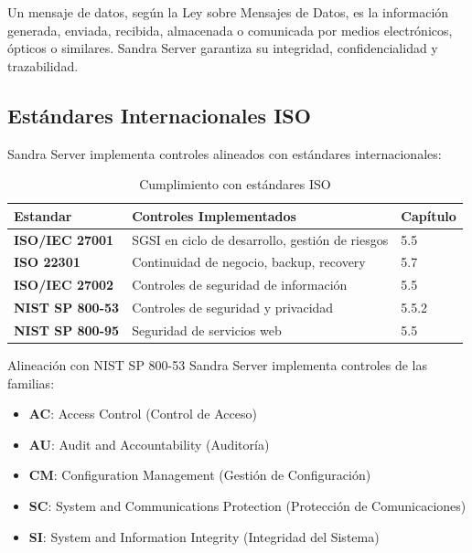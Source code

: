 \begin{definicion}
Un mensaje de datos, según la Ley sobre Mensajes de Datos, es la información generada, enviada, recibida, almacenada o comunicada por medios electrónicos, ópticos o similares. Sandra Server garantiza su integridad, confidencialidad y trazabilidad.
\end{definicion}

\subsection{Estándares Internacionales ISO}

Sandra Server implementa controles alineados con estándares internacionales:

\begin{table}[H]
\centering
\caption{Cumplimiento con estándares ISO}
\begin{tabular}{|l|p{7cm}|p{3cm}|}
\hline
\textbf{Estandar} & \textbf{Controles Implementados} & \textbf{Capítulo} \\ \hline
\textbf{ISO/IEC 27001} & SGSI en ciclo de desarrollo, gestión de riesgos & 5.5 \\ \hline
\textbf{ISO 22301} & Continuidad de negocio, backup, recovery & 5.7 \\ \hline
\textbf{ISO/IEC 27002} & Controles de seguridad de información & 5.5 \\ \hline
\textbf{NIST SP 800-53} & Controles de seguridad y privacidad & 5.5.2 \\ \hline
\textbf{NIST SP 800-95} & Seguridad de servicios web & 5.5 \\ \hline
\end{tabular}
\end{table}

\begin{caja}{Alineación con NIST SP 800-53}
Sandra Server implementa controles de las familias:
\begin{itemize}
\item \textbf{AC}: Access Control (Control de Acceso)
\item \textbf{AU}: Audit and Accountability (Auditoría)
\item \textbf{CM}: Configuration Management (Gestión de Configuración)
\item \textbf{SC}: System and Communications Protection (Protección de Comunicaciones)
\item \textbf{SI}: System and Information Integrity (Integridad del Sistema)
\end{itemize}
\end{caja}

